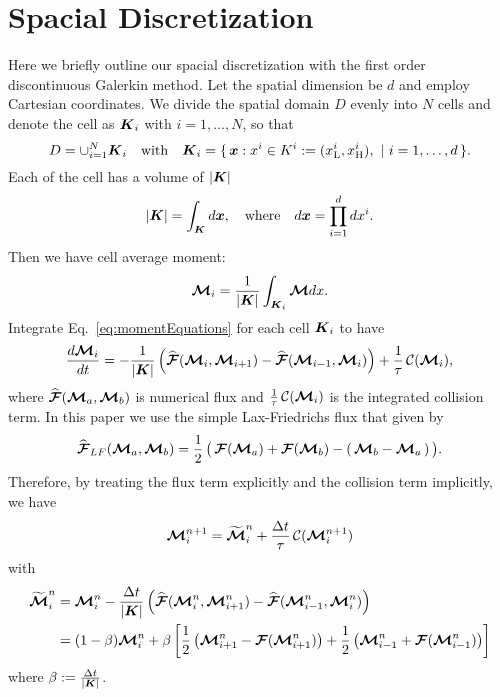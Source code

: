 \section{Spacial Discretization}\label{se:SpacialDiscretization}
Here we briefly outline our spacial discretization with the first order discontinuous Galerkin method.
Let the spatial dimension be $d$ and employ Cartesian coordinates.
We divide the spatial domain $D$ evenly into $N$ cells and denote the cell as $\boldsymbol{K}_{i}$ with $i = 1,\ldots,N$, so that
\begin{equation*}
D = \cup_{i = 1}^{N} \boldsymbol{K}_{i} \quad \text{with} \quad
  \boldsymbol{K}_{i}=\{\,\boldsymbol{x} : x^{i} \in K^{i} := (x_{{\rm L}}^{i},x_{{\rm H}}^{i}),~|~i=1,\ldots,d\,\}.
\end{equation*}
Each of the cell has a volume of $|\boldsymbol{K}|$
\begin{equation*}
  |\boldsymbol{K}| = \int_{\boldsymbol{K}}d\boldsymbol{x}, \quad\text{where}\quad d\boldsymbol{x} = \prod_{i=1}^{d}dx^{i}.  
\end{equation*}
Then we have cell average moment:
\begin{equation}
\boldsymbol{\mathcal{M}}_{i} = \dfrac{1}{|\boldsymbol{K}|} \int_{\boldsymbol{K}_i}\boldsymbol{\mathcal{M}} dx.
\end{equation}
Integrate Eq.~\eqref{eq:momentEquations} for each cell $\boldsymbol{K}_{i}$ to have
\begin{equation}
\dfrac{d \boldsymbol{\mathcal{M}}_{i}}{d t} = - \dfrac{1}{|\boldsymbol{K}|} \left( \widehat{\boldsymbol{\mathcal{F}}}(\boldsymbol{\mathcal{M}}_{i},\boldsymbol{\mathcal{M}}_{i+1}) -  \widehat{\boldsymbol{\mathcal{F}}}(\boldsymbol{\mathcal{M}}_{i-1},\boldsymbol{\mathcal{M}}_{i})\right) + \frac{1}{\tau}\,\mathcal{C}(\boldsymbol{\mathcal{M}}_{i}),
\label{eq:SemiDiscretizatedMomentEquation}
\end{equation}
where $\widehat{\boldsymbol{\mathcal{F}}}(\boldsymbol{\mathcal{M}}_{a},\boldsymbol{\mathcal{M}}_{b})$ is numerical flux and $\frac{1}{\tau}\,\mathcal{C}(\boldsymbol{\mathcal{M}}_{i})$ is the integrated collision term.
In this paper we use the simple Lax-Friedrichs flux that given by
\begin{equation}
  \widehat{\boldsymbol{\mathcal{F}}}_{LF}(\boldsymbol{\mathcal{M}}_{a},\boldsymbol{\mathcal{M}}_{b})
  =\frac{1}{2}\,\big(\,\boldsymbol{\mathcal{F}}(\boldsymbol{\mathcal{M}}_{a})+\boldsymbol{\mathcal{F}}(\boldsymbol{\mathcal{M}}_{b})-(\,\boldsymbol{\mathcal{M}}_{b}-\boldsymbol{\mathcal{M}}_{a}\,)\,\big).
  \label{eq:Lax-Friedrichs flux}
\end{equation}
Therefore, by treating the flux term explicitly and the collision term implicitly, we have
\begin{align}
\boldsymbol{\mathcal{M}}_{i}^{n+1} = \widetilde{\boldsymbol{\mathcal{M}}}^{n}_{i} + \frac{\Delta t}{\tau}\,\mathcal{C}(\boldsymbol{\mathcal{M}}^{n+1}_{i})
\label{eq:MomentIMEX}
\end{align}
with
\begin{align}
\widetilde{\boldsymbol{\mathcal{M}}}^{n}_{i} 
& = \boldsymbol{\mathcal{M}}_{i}^{n} - \dfrac{\Delta t}{|\boldsymbol{K}|} \left( \widehat{\boldsymbol{\mathcal{F}}}(\boldsymbol{\mathcal{M}}^{n}_{i},\boldsymbol{\mathcal{M}}^{n}_{i+1}) -  \widehat{\boldsymbol{\mathcal{F}}}(\boldsymbol{\mathcal{M}}^{n}_{i-1},\boldsymbol{\mathcal{M}}^{n}_{i})\right)\nonumber \\
& = (1-\beta)\boldsymbol{\mathcal{M}}_{i}^{n} + \beta\left[ \frac{1}{2}\left( \boldsymbol{\mathcal{M}}^{n}_{i+1}-\boldsymbol{\mathcal{F}}(\boldsymbol{\mathcal{M}}^{n}_{i+1})\right)  + \frac{1}{2}\left( \boldsymbol{\mathcal{M}}^{n}_{i-1}+\boldsymbol{\mathcal{F}}(\boldsymbol{\mathcal{M}}^{n}_{i-1})\right)\right]
\label{eq:widetildeM}
\end{align}
where $\beta := \frac{\Delta t}{|\boldsymbol{K}|}$.

